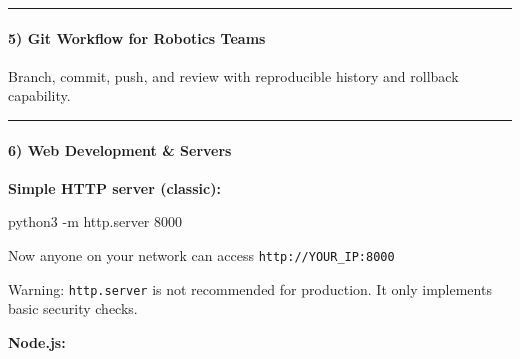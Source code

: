 \documentclass[
  english,
  paper=a4,
  oneside  ,captions=tableheading
]{scrartcl}
\newenvironment{Shaded}{}{}
\newcommand{\AttributeTok}[1]{\textcolor[rgb]{0.49,0.56,0.16}{#1}}
\newcommand{\CommentTok}[1]{\textcolor[rgb]{0.38,0.63,0.69}{\textit{#1}}}
\newcommand{\ExtensionTok}[1]{#1}
\newcommand{\FunctionTok}[1]{\textcolor[rgb]{0.02,0.16,0.49}{#1}}
\newcommand{\KeywordTok}[1]{\textcolor[rgb]{0.00,0.44,0.13}{\textbf{#1}}}
\newcommand{\NormalTok}[1]{#1}
\newcommand{\StringTok}[1]{\textcolor[rgb]{0.25,0.44,0.63}{#1}}
\newcommand{\VariableTok}[1]{\textcolor[rgb]{0.10,0.09,0.49}{#1}}
\renewenvironment{quote}{\begin{customblockquote}\list{}{\rightmargin=0em\leftmargin=0em}%
\item\relax\color{blockquote-text}\ignorespaces}{\unskip\unskip\endlist\end{customblockquote}}
\begin{document}
\begin{center}\rule{0.5\linewidth}{0.5pt}\end{center}

\paragraph{5) Git Workflow for Robotics
Teams}\label{git-workflow-for-robotics-teams}

Branch, commit, push, and review with reproducible history and rollback
capability.

\begin{center}\rule{0.5\linewidth}{0.5pt}\end{center}

\paragraph{6) Web Development \& Servers}\label{web-development-servers}

\textbf{Simple HTTP server (classic):}

\begin{Shaded}
\begin{Highlighting}[]
\ExtensionTok{python3} \AttributeTok{{-}m}\NormalTok{ http.server 8000}
\end{Highlighting}
\end{Shaded}

Now anyone on your network can access \texttt{http://YOUR\_IP:8000}

\begin{quote}
\faExclamationCircle Warning: \texttt{http.server} is not recommended
for production. It only implements basic security checks.
\end{quote}

\textbf{Node.js:}

\begin{Shaded}
\end{Shaded}
\end{document}
